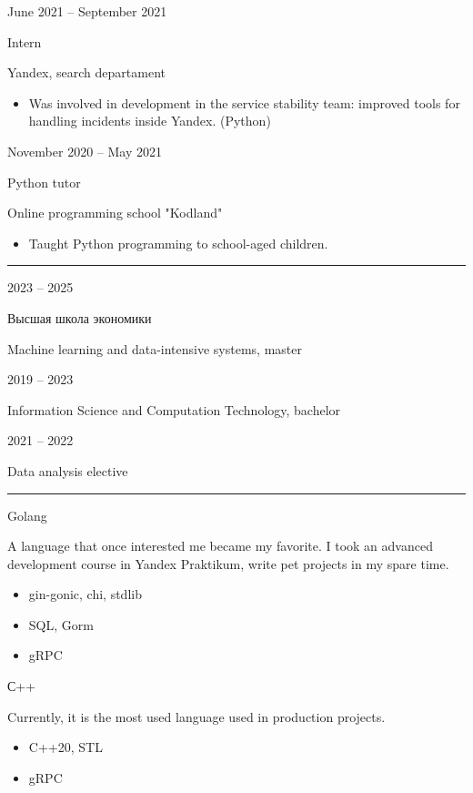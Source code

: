 \documentclass[a4paper,10pt]{article}
\newlength{\cvcolumngapwidth}
\newlength{\cvleftcolumnwidth}
\newlength{\cvrightcolumnwidth}
\newcommand{\cvsectionstyle}[1]{{\normalsize\cvsectionfont\textcolor{cvsectioncolor}{#1}}}
\newcommand{\cvtitlestyle}[1]{{\large\cvtitlefont\textcolor{cvtitlecolor}{#1}}}
\newcommand{\cvdurationstyle}[1]{{\small\cvdurationfont\textcolor{cvdurationcolor}{#1}}}
\newcommand{\cvheadingstyle}[1]{{\normalsize\cvheadingfont\textcolor{cvheadingcolor}{#1}}}
\newlength{\cvafteritemskipamount}
\newlength{\cvaftersectionskipamount}
\newlength{\cvbetweensectionandheadingextraskipamount}
\newlength{\cvaftertitleskipamount}
\newlength{\cvparskip}
\newcommand{\cvsection}[1]{
    \begin{minipage}[t]{\cvleftcolumnwidth}
        \raggedleft\cvsectionstyle{#1}
    \end{minipage}%
    \hspace{\cvcolumngapwidth}%
    \begin{minipage}[t]{\cvrightcolumnwidth}
        \textcolor{cvrulecolor}{\rule{\cvrightcolumnwidth}{0.3mm}}
    \end{minipage}

    \vspace{\cvaftersectionskipamount}
}
\newcommand{\cvitem}[2]{
    \begin{minipage}[t]{\cvleftcolumnwidth}
        \raggedleft #1
    \end{minipage}%
    \hspace{\cvcolumngapwidth}%
    \begin{minipage}[t]{\cvrightcolumnwidth}
        \setlength{\parskip}{\cvparskip} #2
    \end{minipage}

    \vspace{\cvafteritemskipamount}
}
\newcommand{\cvtitle}[1]{
    \cvtitlestyle{#1}

    \vspace{\cvaftertitleskipamount}
    \vspace{-\cvparskip}
}
\begin{document}
\cvitem{
    \cvdurationstyle{June 2021 -- September 2021}
}{
    \cvtitle{Intern}

    Yandex, search departament

    \begin{itemize}[leftmargin=*]
        \item Was involved in development in the service stability team: improved tools for handling incidents inside Yandex. (Python)
    \end{itemize}
}

\cvitem{
    \cvdurationstyle{November 2020 -- May 2021}
}{
    \cvtitle{Python tutor}

    Online programming school "Kodland"

    \begin{itemize}[leftmargin=*]
        \item Taught Python programming to school-aged children.
    \end{itemize}
}



\cvsection{Education}

\cvitem{
    \cvdurationstyle{2023 -- 2025}
}{
    \cvtitle{Высшая школа экономики}

    Machine learning and data-intensive systems, master
}

\cvitem{
    \cvdurationstyle{2019 -- 2023}
}{
    Information Science and Computation Technology, bachelor
}

\cvitem{
    \cvdurationstyle{2021 -- 2022}
}{
    Data analysis elective
}


\cvsection{Skills}

\vspace{\cvbetweensectionandheadingextraskipamount}

\cvitem{
    \cvheadingstyle{Golang}
}{
    A language that once interested me became my favorite. I took an advanced development course in Yandex Praktikum, write pet projects in my spare time.
    \begin{itemize}
        \item gin-gonic, chi, stdlib
        \item SQL, Gorm
        \item gRPC
    \end{itemize}
}

\cvitem{
    \cvheadingstyle{С++}
}{
    Currently, it is the most used language used in production projects.
    \begin{itemize}
        \item C++20, STL
        \item gRPC
    \end{itemize}
}
\end{document}

